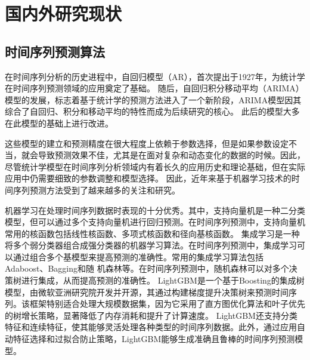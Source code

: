 \section{国内外研究现状}
\subsection{时间序列预测算法}
在时间序列分析的历史进程中，自回归模型\cite{PhysRevE.84.016106}（AR），首次提出于1927年，为统计学在时间序列预测领域的应用奠定了基础。
随后，自回归积分移动平均\cite{jiang2011multifractal}（ARIMA）模型的发展，标志着基于统计学的预测方法进入了一个新阶段，ARIMA模型因其综合了自回归、积分和移动平均的特性而成为后续研究的核心。
此后的模型大多在此模型的基础上进行改进。

这些模型的建立和预测精度在很大程度上依赖于参数选择，但是如果参数设定不当，就会导致预测效果不佳，尤其是在面对复杂和动态变化的数据的时候。因此，尽管统计学模型在时间序列分析领域内有着长久的应用历史和理论基础，但在实际应用中仍需要细致的参数调整和模型选择。
因此，近年来基于机器学习技术的时间序列预测方法受到了越来越多的关注和研究。

机器学习在处理时间序列数据时表现的十分优秀。其中，支持向量机\cite{zhang2020support}是一种二分类模型，但可以通过多个支持向量机进行回归预测\cite{sapankevych2009time}。在时间序列预测中，支持向量机常用的核函数包括线性核函数、多项式核函数和径向基核函数。
集成学习\cite{dong2020survey}是一种将多个弱分类器组合成强分类器的机器学习算法。在时间序列预测中，集成学习可以通过组合多个基模型来提高预测的准确性\cite{galicia2019multi}。常用的集成学习算法包括Adaboost\cite{hastie2009multi}、Bagging\cite{quinlan1996bagging}和随
机森林\cite{genuer2020random}等。在时间序列预测中，随机森林可以对多个决策树进行集成，从而提高预测的准确性\cite{khashei2019comparative}。
LightGBM\cite{ke2017lightgbm}是一个基于Boosting的集成树模型，由微软亚洲研究院开发并开源，其通过构建梯度提升决策树来预测时间序列。该框架特别适合处理大规模数据集，因为它采用了直方图优化算法和叶子优先的树增长策略，显著降低了内存消耗和提升了计算速度。
LightGBM还支持分类特征和连续特征，使其能够灵活处理各种类型的时间序列数据。此外，通过应用自动特征选择和过拟合防止策略，LightGBM能够生成准确且鲁棒的时间序列预测模型。

